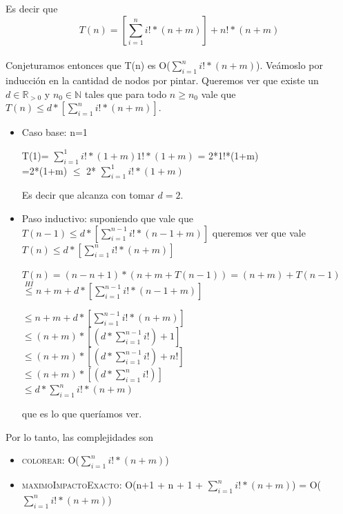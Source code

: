 \indent Es decir que $$T(n)= \left[ \sum_{i=1}^{n} i! * (n+m) \right] + n! * (n+m)$$\\

Conjeturamos entonces que T(n) es O($\sum_{i=1}^{n} i! * (n+m) $).
Veámoslo por inducción en la cantidad de nodos por pintar. 
Queremos ver que existe un $d \in \mathbb{R}_{> 0}$ y $n_{0}  \in \mathbb{N}$ tales que para todo $n \geq n_{0}$ vale que $T(n) \leq d * [\sum_{i=1}^{n} i! * (n+m)] $.

\begin{itemize}
	\item Caso base: n=1 
\begin{center}
T(1)= $\sum_{i=1}^{1} i! * (1+m)  1! * (1+m) $ = 2*1!*(1+m)\\
=2*(1+m) $\leq$ 2*  $\sum_{i=1}^{1} i! * (1+m)$ 
\end{center}

Es decir que alcanza con tomar $d=2$.

\item Paso inductivo: suponiendo que vale que $T(n-1) \leq d * [\sum_{i=1}^{n-1} i! * (n-1+m)] $ queremos ver que vale $T(n) \leq d * [\sum_{i=1}^{n} i! * (n+m)] $ 

\begin{center}

$T(n)=(n-n+1)*(n+m + T(n-1))= (n+m) + T(n-1) $\\

$\stackrel{HI}{\leq} n+m + d * [\sum_{i=1}^{n-1} i! * (n-1+m)] $

$\leq n+m + d * [\sum_{i=1}^{n-1} i! * (n+m)] $ \\

$\leq (n+m) *[ (d* \sum_{i=1}^{n-1} i!) + 1] $ \\

$\leq (n+m) *[ (d* \sum_{i=1}^{n-1} i!) + n!]$ \\

$\leq (n+m) *[ (d* \sum_{i=1}^{n} i!)] $\\

$\leq  d* \sum_{i=1}^{n} i!*(n+m)$\\

\end{center}

\indent que es lo que queríamos ver.\\
\end{itemize}

Por lo tanto, las complejidades son

\begin{itemize}
	\item \textsc{colorear}: O($\sum_{i=1}^{n} i! * (n+m) $)
	\item \textsc{maximoImpactoExacto}: O(n+1 + n + 1 + $\sum_{i=1}^{n} i! * (n+m) $) = O($\sum_{i=1}^{n} i! * (n+m) $)
\end{itemize}

